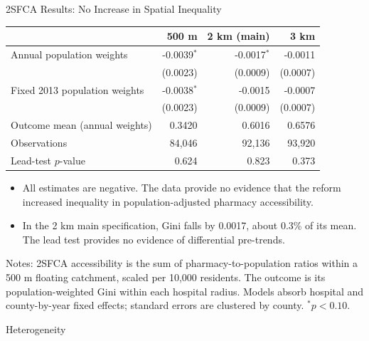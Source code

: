 \documentclass[aspectratio=169,11pt]{beamer}
\newcommand{\sectiondivider}[1]{%
  \begin{frame}
    \vfill
    \centering
    {\usebeamercolor[fg]{structure}\LARGE #1}
    \vfill
  \end{frame}%
}
\begin{document}
\begin{frame}{2SFCA Results: No Increase in Spatial Inequality}
\centering
\footnotesize
\begin{tabular}{lrrr}
\toprule
 & 500 m & 2 km (main) & 3 km \\
\midrule
Annual population weights
 & -0.0039$^{*}$ & -0.0017$^{*}$ & -0.0011 \\
 & (0.0023) & (0.0009) & (0.0007) \\
Fixed 2013 population weights
 & -0.0038$^{*}$ & -0.0015 & -0.0007 \\
 & (0.0023) & (0.0009) & (0.0007) \\
\addlinespace
Outcome mean (annual weights)
 & 0.3420 & 0.6016 & 0.6576 \\
Observations
 & 84,046 & 92,136 & 93,920 \\
Lead-test $p$-value
 & 0.624 & 0.823 & 0.373 \\
\bottomrule
\end{tabular}

\vspace{0.5em}
\begin{itemize}\setlength\itemsep{0.25em}
  \item All estimates are negative. The data provide no evidence that the reform increased inequality in population-adjusted pharmacy accessibility.
  \item In the 2 km main specification, Gini falls by 0.0017, about 0.3\% of its mean. The lead test provides no evidence of differential pre-trends.
\end{itemize}
\vspace{0.15em}
\raggedright\tiny Notes: 2SFCA accessibility is the sum of pharmacy-to-population ratios within a 500 m floating catchment, scaled per 10,000 residents. The outcome is its population-weighted Gini within each hospital radius. Models absorb hospital and county-by-year fixed effects; standard errors are clustered by county. $^{*}p<0.10$.
\end{frame}

\sectiondivider{Heterogeneity}
\end{document}
